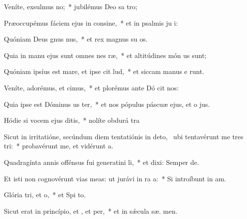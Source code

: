 \item Veníte, exsulmus no;~* jubilémus Deo sa tro;
\item Præoccupémus fáciem ejus in consine,~* et in psalmis ju i:
\item Quóniam Deus gnus nus,~* et rex magnus su  os.
\item Quia in manu ejus sunt omnes nes ræ,~* et altitúdines món us sunt;
\item Quóniam ipsíus est mare, et ipse cit lud,~* et siccam manus e runt.
\item Veníte, adorémus, et cimus,~* et plorémus ante Dó  cit nos:
\item Quia ipse est Dóminus us ter,~* et nos pópulus páscuæ ejus, et o  jus.
\item Hódie si vocem ejus ditis,~* nolíte obdurá  tra
\item Sicut in irritatióne, secúndum diem tentatiónis in deto,~\pscross{} ubi tentavérunt me tres tri:~* probavérunt me, et vidérunt  a.
\item Quadragínta annis offénsus fui generatini li,~* et dixi: Semper   de.
\item Et isti non cognovérunt vias meas: ut jurávi in ra a:~* Si introíbunt in  am.
\item Glória tri, et o,~* et Spi to.
\item Sicut erat in princípio, et , et per,~* et in sǽcula sæ. men.
